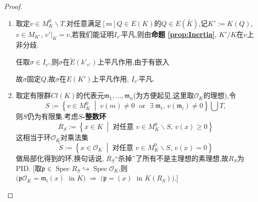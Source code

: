 \documentclass[12pt,A4paper,oneside,reqno]{amsart}
\numberwithin{equation}{section}
\theoremstyle{definition}
\theoremstyle{plain}
\theoremstyle{plain}
\numberwithin{equation}{section}
\theoremstyle{remark}
\newcommand{\Spec}{\operatorname{Spec}}
\begin{document}
\begin{proof}
	\begin{enumerate}[1.]
		\item 取定$v \in M_K^{0} \smallsetminus T$.对任意满足$[m]Q \in E(K)$的$Q \in E(\bar{K})$,记$K':=K(Q)$, $v \in M_{K'}$, $v'|_K=v$,若我们能证明$I_{v'}$平凡,则由\textbf{命题 \ref{prop:Inertia}}, $K'/K$在$v$上非分歧.
		
		任取$\sigma \in I_{v'}$,则$\sigma$在$\tilde{E}(k'_{v'})$上平凡作用,由于有嵌入
		\begin{center}
		\end{center}
	故$\sigma$固定$Q$,故$\sigma$在$E(K')$上平凡作用, $I_{v'}$平凡.
		\item 取定有限群$Cl(K)$的代表元$\mathfrak{m}_1,\ldots , \mathfrak{m}_n$(为方便起见,这里取$\mathcal{O}_K$的理想),令
		$$S:=\left\{v \in M_K^0 \;\middle|\; v(m) \neq 0  \;\text{ or }\; \exists\; \mathfrak{m}_i,\, v(\mathfrak{m}_i) \neq 0\right\} 
		\bigcup T, $$
		则$S$仍为有限集.考虑\textbf{$S$-整数环}
		$$R_S:=\left\{x \in K \;\middle|\;\text{对任意 }v \in M_K^{0} \smallsetminus S ,\, v(x) \geqslant 0  \right\}$$
		这相当于环$\mathcal{O}_K$对乘法集
		$$\tilde{S}:=\left\{x \in \mathcal{O}_K \;\middle|\;\text{对任意 }v \in M_K^{0} \smallsetminus S ,\, v(x) = 0  \right\}$$
		做局部化得到的环,换句话说, $R_S$“杀掉”了所有不是主理想的素理想,故$R_S$为PID. [取$\mathfrak{p} \in \Spec R_S \hookrightarrow \Spec \mathcal{O}_K$,则
		$\big(\mathfrak{p}\mathcal{O}_K=\mathfrak{m}_i (x) \; \text{ in }K\big) \;\Longrightarrow\; \big(\mathfrak{p}=(x) \; \text{ in }K(R_S)\big)$.]
		

\end{enumerate}
\end{proof}
\end{document}
